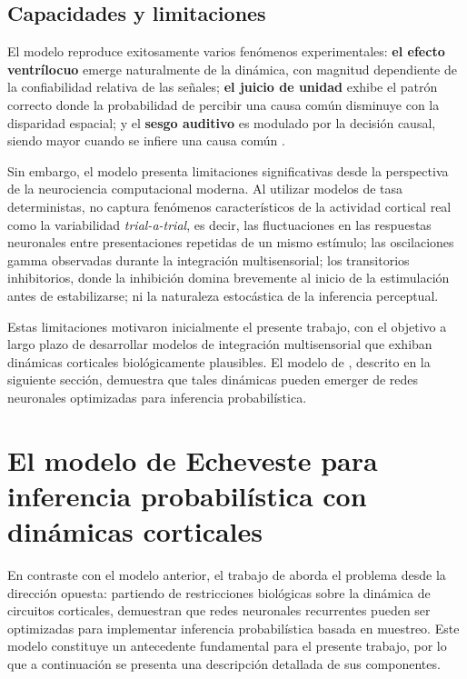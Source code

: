 \subsection{Capacidades y limitaciones}
\label{subsec:cuppini_limitaciones}

El modelo reproduce exitosamente varios fenómenos experimentales: \textbf{el efecto ventrílocuo} emerge naturalmente de la dinámica, con magnitud dependiente de la confiabilidad relativa de las señales; \textbf{el juicio de unidad} exhibe el patrón correcto donde la probabilidad de percibir una causa común disminuye con la disparidad espacial; y el \textbf{sesgo auditivo} es modulado por la decisión causal, siendo mayor cuando se infiere una causa común \citep{cuppini2017biologically}.

Sin embargo, el modelo presenta limitaciones significativas desde la perspectiva de la neurociencia computacional moderna. Al utilizar modelos de tasa deterministas, no captura fenómenos característicos de la actividad cortical real como la variabilidad \textit{trial-a-trial}, es decir, las fluctuaciones en las respuestas neuronales entre presentaciones repetidas de un mismo estímulo; las oscilaciones gamma observadas durante la integración multisensorial; los transitorios inhibitorios, donde la inhibición domina brevemente al inicio de la estimulación antes de estabilizarse; ni la naturaleza estocástica de la inferencia perceptual.

Estas limitaciones motivaron inicialmente el presente trabajo, con el objetivo a largo plazo de desarrollar modelos de integración multisensorial que exhiban dinámicas corticales biológicamente plausibles. El modelo de \citeauthor{echeveste2020cortical}, descrito en la siguiente sección, demuestra que tales dinámicas pueden emerger de redes neuronales optimizadas para inferencia probabilística.


\section{El modelo de Echeveste para inferencia probabilística con dinámicas corticales}
\label{sec:modelo_echeveste}

En contraste con el modelo anterior, el trabajo de \citet{echeveste2020cortical} aborda el problema desde la dirección opuesta: partiendo de restricciones biológicas sobre la dinámica de circuitos corticales, demuestran que redes neuronales recurrentes pueden ser optimizadas para implementar inferencia probabilística basada en muestreo. Este modelo constituye un antecedente fundamental para el presente trabajo, por lo que a continuación se presenta una descripción detallada de sus componentes.

